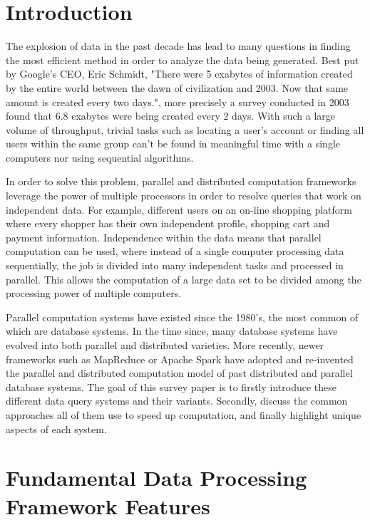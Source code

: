 \documentclass[10pt,twocolumn]{IEEEtran11}
\begin{document}
\section{Introduction}
The explosion of data in the past decade has lead to many questions in finding the most efficient method in order to analyze the data being generated. Best put by Google's CEO, Eric Schmidt, "There were 5 exabytes of information created by the entire world between the dawn of civilization and 2003. Now that same amount is created every two days.", more precisely a survey conducted in 2003 found that 6.8 exabytes were being created every 2 days\cite{gantz2010digital}.  With such a large volume of throughput, trivial tasks such as locating a user's account or finding all users within the same group can't be found in meaningful time with a single computers nor using sequential algorithms.
\par
In order to solve this problem, parallel and distributed computation frameworks leverage the power of multiple processors in order to resolve queries that work on independent data.  For example,  different users on an on-line shopping platform where every shopper has their own independent profile, shopping cart and payment information.  Independence within the data means that parallel computation can be used, where instead of a single computer processing data sequentially, the job is divided into many independent tasks and processed in parallel.  This allows the computation of a large data set to be divided among the processing power of multiple computers.
\par
Parallel computation systems have existed since the 1980's, the most common of which are database systems. In the time since, many database systems have evolved into both parallel and distributed varieties.  More recently, newer frameworks such as  MapReduce or Apache Spark have adopted and re-invented the parallel and distributed computation model of past distributed and parallel database systems.  The goal of this survey paper is to firstly introduce these different data query systems and their variants.  Secondly, discuss the common approaches all of them use to speed up computation, and finally highlight unique aspects of each system.

\section{Fundamental Data Processing Framework Features}
\end{document}
